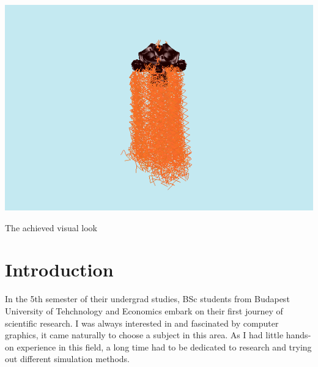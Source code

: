 \documentclass[sigplan,screen,nonacm]{acmart}
\begin{document}

\begin{teaserfigure}
  \includegraphics[width=\textwidth]{teaser.png}
  \caption{The achieved visual look}
  \label{fig:teaser}
\end{teaserfigure}

\maketitle
\renewcommand{\shortauthors}{Barnabás Börcsök}


\section{Introduction}
In the 5th semester of their undergrad studies, BSc students from Budapest
University of Tehchnology and Economics embark on their first journey of
scientific research. I was always interested in and fascinated by computer 
graphics, it came naturally to choose a subject in this area. As I had little
 hands-on experience in this field, a long time had to be dedicated
to research and trying out different simulation methods.
\end{document}
